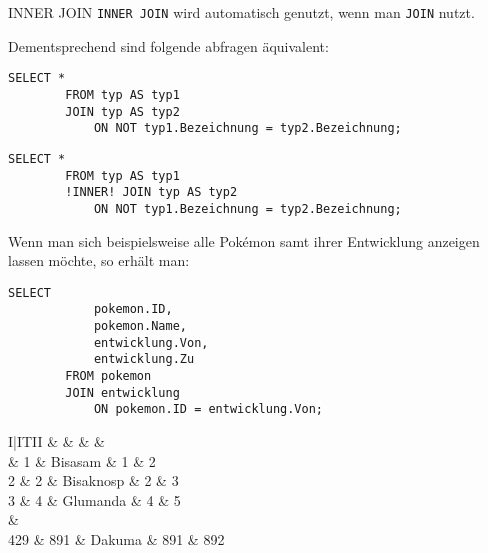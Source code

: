 \begin{sql}{INNER JOIN}
    \texttt{INNER JOIN} wird automatisch genutzt, wenn man \texttt{JOIN} nutzt.

    Dementsprechend sind folgende abfragen äquivalent:

    \begin{lstlisting}[language=mysql]
        SELECT *
        FROM typ AS typ1
        JOIN typ AS typ2
            ON NOT typ1.Bezeichnung = typ2.Bezeichnung;
    \end{lstlisting}

    \begin{lstlisting}[language=mysql]
        SELECT *
        FROM typ AS typ1
        !INNER! JOIN typ AS typ2
            ON NOT typ1.Bezeichnung = typ2.Bezeichnung;
    \end{lstlisting}

    Wenn man sich beispielsweise alle Pokémon samt ihrer Entwicklung anzeigen lassen möchte, so erhält man:

    \begin{lstlisting}[language=mysql]
        SELECT
            pokemon.ID,
            pokemon.Name,
            entwicklung.Von,
            entwicklung.Zu
        FROM pokemon
        JOIN entwicklung
            ON pokemon.ID = entwicklung.Von;
    \end{lstlisting}

    \setcounter{rownum}{0}
    \begin{tabular}{I|ITII}
                                   &     &  &  &  \\                          & 1                         & Bisasam                  & 1                       & 2                      \\
        2                          & 2                         & Bisaknosp                & 2                       & 3                      \\
        3                          & 4                         & Glumanda                 & 4                       & 5                      \\
         &                                                                                \\
        429                        & 891                       & Dakuma                   & 891                     & 892                    \\
    \end{tabular}
\end{sql}

